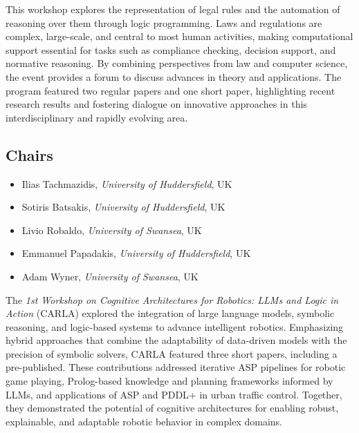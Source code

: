 \documentclass[
]{ceurart}
\begin{document}


\noindent
This workshop explores the representation of legal rules and the automation of reasoning over them through logic programming. Laws and regulations are complex, large-scale, and central to most human activities, making computational support essential for tasks such as compliance checking, decision support, and normative reasoning. By combining perspectives from law and computer science, the event provides a forum to discuss advances in theory and applications. The program featured two regular papers and one short paper, highlighting recent research results and fostering dialogue on innovative approaches in this interdisciplinary and rapidly evolving area.

\subsection*{Chairs}
\begin{itemize}
\item Ilias Tachmazidis, \emph{University of Huddersfield}, UK

\item Sotiris Batsakis, \emph{University of Huddersfield}, UK

\item Livio Robaldo, \emph{University of Swansea}, UK

\item Emmanuel Papadakis, \emph{University of Huddersfield}, UK

\item Adam Wyner, \emph{University of Swansea}, UK
\end{itemize}


\noindent
The \emph{1st Workshop on Cognitive Architectures for Robotics: LLMs and Logic in Action} (CARLA) explored the integration of large language models, symbolic reasoning, and logic-based systems to advance intelligent robotics. Emphasizing hybrid approaches that combine the adaptability of data-driven models with the precision of symbolic solvers, CARLA featured three short papers, including a pre-published. These contributions addressed iterative ASP pipelines for robotic game playing, Prolog-based knowledge and planning frameworks informed by LLMs, and applications of ASP and PDDL+ in urban traffic control. Together, they demonstrated the potential of cognitive architectures for enabling robust, explainable, and adaptable robotic behavior in complex domains.
\end{document}
